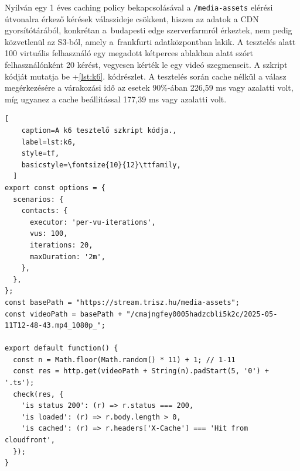 Nyilván egy 1 éves caching policy bekapcsolásával a \verb|/media-assets| elérési útvonalra érkező kérések válaszideje csökkent, hiszen az adatok a CDN gyorsítótárából, konkrétan a~budapesti edge szerverfarmról érkeztek, nem pedig közvetlenül az S3-ból, amely a~frankfurti adatközpontban lakik. A tesztelés alatt 100 virtuális felhasználó egy megadott kétperces ablakban alatt szórt felhasználónként 20 kérést, vegyesen kérték le egy videó szegmenseit. A szkript kódját mutatja be \az+\ref{lst:k6}. kódrészlet. A tesztelés során cache nélkül a válasz megérkezésére a várakozási idő az esetek 90\%-ában 226,59 ms vagy azalatti volt, míg ugyanez a cache beállítással 177,39 ms vagy azalatti volt.

\begin{minipage}{0.92\textwidth}
  \begin{lstlisting}[
    caption=A k6 tesztelő szkript kódja.,
    label=lst:k6,
    style=tf,
    basicstyle=\fontsize{10}{12}\ttfamily,
  ]
export const options = {
  scenarios: {
    contacts: {
      executor: 'per-vu-iterations',
      vus: 100,
      iterations: 20,
      maxDuration: '2m',
    },
  },
};
const basePath = "https://stream.trisz.hu/media-assets";
const videoPath = basePath + "/cmajngfey0005hadzcbli5k2c/2025-05-11T12-48-43.mp4_1080p_";

export default function() {
  const n = Math.floor(Math.random() * 11) + 1; // 1-11
  const res = http.get(videoPath + String(n).padStart(5, '0') + '.ts');
  check(res, {
    'is status 200': (r) => r.status === 200,
    'is loaded': (r) => r.body.length > 0,
    'is cached': (r) => r.headers['X-Cache'] === 'Hit from cloudfront',
  });
}  
\end{lstlisting}
\end{minipage}
